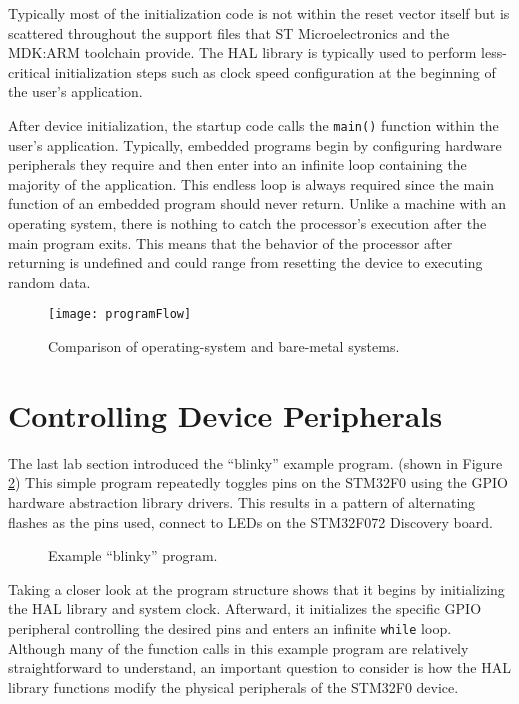 \documentclass[11pt,fleqn]{book} %
\newcommand{\code}[3]{
    \begin{figure}[]
        \colorbox{gray!20!white}{
            \parbox{\linewidth-2\fboxsep} {
                \centering 
                
            }
        }
        \caption{#2}
        \label{#3}
    \end{figure}
}
\begin{document}
Typically most of the initialization code is not within the reset vector itself but is scattered throughout the support files that ST Microelectronics and the MDK:ARM toolchain provide. The HAL library is typically used to perform less-critical initialization steps such as clock speed configuration at the beginning of the user's application. 

After device initialization, the startup code calls the \texttt{main()} function within the user's application. Typically, embedded programs begin by configuring hardware peripherals they require and then enter into an infinite loop containing the majority of the application. This endless loop is always required since the main function of an embedded program should never return. Unlike a machine with an operating system, there is nothing to catch the processor's execution after the main program exits. This means that the behavior of the processor after returning is undefined and could range from resetting the device to executing random data.

\begin{figure}[]
    \centering\texttt{[image: programFlow]}
    \caption{Comparison of operating-system and bare-metal systems. }
    \label{programFlow}
\end{figure}


\section{Controlling Device Peripherals}

The last lab section introduced the ``blinky'' example program. (shown in Figure \ref{blinky}) This simple program repeatedly toggles pins on the STM32F0 using the GPIO hardware abstraction library drivers. This results in a pattern of alternating flashes as the pins used, connect to LEDs on the STM32F072 Discovery board. 
\code{./Files/blinky.c}{Example ``blinky'' program.}{blinky}

Taking a closer look at the program structure shows that it begins by initializing the HAL library and system clock. Afterward, it initializes the specific GPIO peripheral controlling the desired pins and enters an infinite \texttt{while} loop. Although many of the function calls in this example program are relatively straightforward to understand, an important question to consider is how the HAL library functions modify the physical peripherals of the STM32F0 device.
\end{document}
